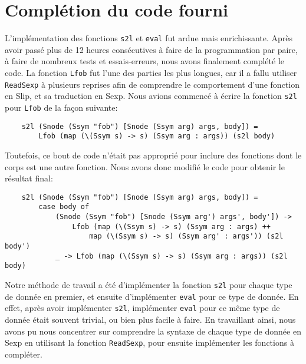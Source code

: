 \documentclass{article}
\begin{document}
\section{Complétion du code fourni}

\noindent L'implémentation des fonctions \texttt{s2l} et \texttt{eval} fut ardue mais enrichissante. Après avoir passé plus de 12 heures consécutives à faire de la programmation par paire, à faire de nombreux tests et essais-erreurs, nous avons finalement complété le code. La fonction \texttt{Lfob} fut l’une des parties les plus longues, car il a fallu utiliser \texttt{ReadSexp} à plusieurs reprises afin de comprendre le comportement d'une fonction en Slip, et sa traduction en Sexp. Nous avions commencé à écrire la fonction \texttt{s2l} pour \texttt{Lfob} de la façon suivante:
{\footnotesize
\begin{verbatim}
    s2l (Snode (Ssym "fob") [Snode (Ssym arg) args, body]) = 
        Lfob (map (\(Ssym s) -> s) (Ssym arg : args)) (s2l body)
\end{verbatim}
}
\noindent Toutefois, ce bout de code n'était pas approprié pour inclure des fonctions dont le corps est une autre fonction. Nous avons donc modifié le code pour obtenir le résultat final:
{\footnotesize
\begin{verbatim}
    s2l (Snode (Ssym "fob") [Snode (Ssym arg) args, body]) = 
        case body of
            (Snode (Ssym "fob") [Snode (Ssym arg') args', body']) ->
                Lfob (map (\(Ssym s) -> s) (Ssym arg : args) ++ 
                    map (\(Ssym s) -> s) (Ssym arg' : args')) (s2l body')
            _ -> Lfob (map (\(Ssym s) -> s) (Ssym arg : args)) (s2l body)
\end{verbatim}
}
\noindent Notre méthode de travail a été d'implémenter la fonction \texttt{s2l} pour chaque type de donnée en premier, et ensuite d'implémenter \texttt{eval} pour ce type de donnée. En effet, après avoir implémenter \texttt{s2l}, implémenter \texttt{eval} pour ce même type de donnée était souvent trivial, ou bien plus facile à faire. En travaillant ainsi, nous avons pu nous concentrer sur comprendre la syntaxe de chaque type de donnée en Sexp en utilisant la fonction \texttt{ReadSexp}, pour ensuite implémenter les fonctions à compléter.\\
\end{document}
